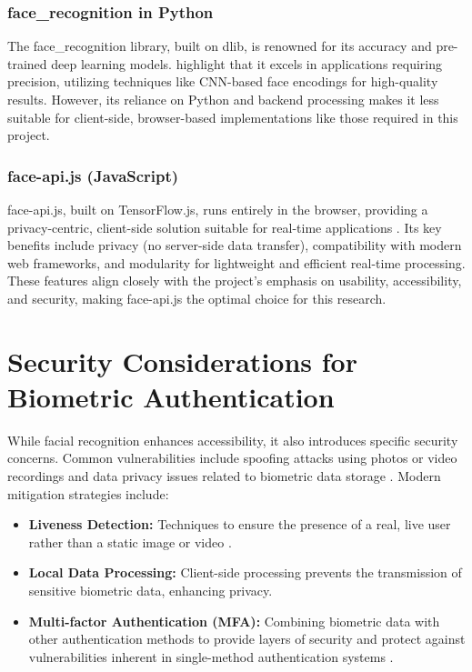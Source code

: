 \subsubsection{face\_recognition in Python}  
The face\_recognition library, built on dlib, is renowned for its accuracy and pre-trained deep learning models. \textcite{Zhang2020} highlight that it excels in applications requiring precision, utilizing techniques like CNN-based face encodings for high-quality results. However, its reliance on Python and backend processing makes it less suitable for client-side, browser-based implementations like those required in this project.

\subsubsection{face-api.js (JavaScript)}
face-api.js, built on TensorFlow.js, runs entirely in the browser, providing a privacy-centric, client-side solution suitable for real-time applications \autocite{Vageele2024}. Its key benefits include privacy (no server-side data transfer), compatibility with modern web frameworks, and modularity for lightweight and efficient real-time processing. These features align closely with the project's emphasis on usability, accessibility, and security, making face-api.js the optimal choice for this research.

\section{Security Considerations for Biometric Authentication}
While facial recognition enhances accessibility, it also introduces specific security concerns. Common vulnerabilities include spoofing attacks using photos or video recordings and data privacy issues related to biometric data storage \autocite{Bowyer2006, Bahia2024}. Modern mitigation strategies include:
\begin{itemize}
\item \textbf{Liveness Detection:} Techniques to ensure the presence of a real, live user rather than a static image or video \autocite{Kuznetsov2024}.
\item \textbf{Local Data Processing:} Client-side processing prevents the transmission of sensitive biometric data, enhancing privacy.
\item \textbf{Multi-factor Authentication (MFA):} Combining biometric data with other authentication methods to provide layers of security and protect against vulnerabilities inherent in single-method authentication systems \autocite{Furnell2022}.
\end{itemize}

